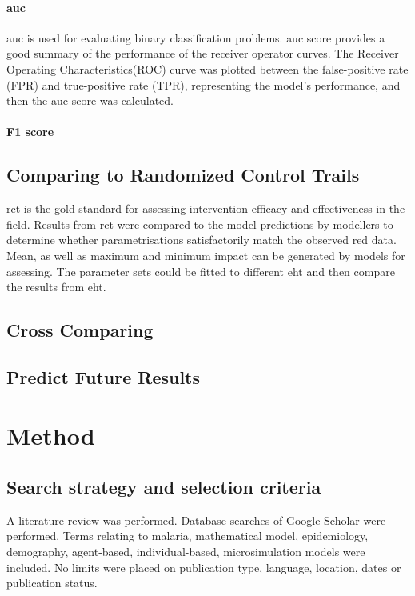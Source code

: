 \documentclass[a4paper, 12pt, twoside]{article}
\begin{document}
\paragraph{\gls{auc}}%
\label{par:auc}
\gls{auc} is used for evaluating binary classification problems.
\gls{auc} score provides a good summary of the performance of the receiver operator curves.
The Receiver Operating Characteristics(ROC) curve was plotted between the false-positive rate (FPR) and true-positive rate (TPR), representing the model’s performance, and then the \gls{auc} score was calculated.

\paragraph{F1 score}%
\label{par:f1_score}


\subsection{Comparing to Randomized Control Trails}

\gls{rct} is the gold standard for assessing intervention efficacy and effectiveness in the field.
Results from \gls{rct} were compared to the model predictions by modellers to determine whether parametrisations satisfactorily match the observed red data\cite{Sherrard-Smith2018b}.
Mean, as well as maximum and minimum impact can be generated by models for assessing.
The parameter sets could be fitted to different \gls{eht} and then compare the results from \gls{eht}.

\subsection{Cross Comparing}
\subsection{Predict Future Results}

\section{Method}%
\label{sec:method}
\subsection{Search strategy and selection criteria}
A literature review was performed.
Database searches of Google Scholar were performed.
Terms relating to malaria, mathematical model, epidemiology, demography, agent-based, individual-based, microsimulation models were included. No limits were placed on publication type, language, location, dates or publication status.
\end{document}
